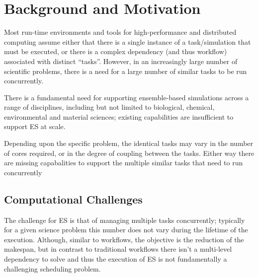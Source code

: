 \documentclass{sig-alternate}
\begin{document}
\section{Background and Motivation} 


Most run-time environments and tools for high-performance and
distributed computing assume either that there is a single instance of
a task/simulation that must be executed, or there is a complex
dependency (and thus workflow) associated with distinct ``tasks''.
However, in an increasingly large number of scientific problems, there
is a need for a large number of similar tasks to be run concurrently.

There is a fundamental need for supporting ensemble-based simulations
across a range of disciplines, including but not limited to
biological, chemical, environmental and material sciences; existing
capabilities are insufficient to support ES at scale.

Depending upon the specific problem, the identical tasks may vary in
the number of cores required, or in the degree of coupling between the
tasks.  Either way there are missing capabalities to support the
multiple similar tasks that need to run concurrently



\subsection{Computational Challenges}

The challenge for ES is that of managing multiple tasks concurrently;
typically for a given science problem this number does not vary during
the lifetime of the execution. Although, similar to workflows, the
objective is the reduction of the makespan, but in contrast to
traditional workflows there isn't a multi-level dependency to solve
and thus the execution of ES is not fundamentally a challenging
scheduling problem.
\end{document}
